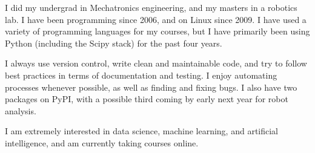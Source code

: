 I did my undergrad in Mechatronics engineering, and my masters in a robotics lab.
I have been programming since 2006, and on Linux since 2009.
I have used a variety of programming languages for my courses, but I have primarily been using Python (including the Scipy stack) for the past four years.

I always use version control, write clean and maintainable code, and try to follow best practices in terms of documentation and testing.
I enjoy automating processes whenever possible, as well as finding and fixing bugs.
I also have two packages on PyPI, with a possible third coming by early next year for robot analysis.

I am extremely interested in data science, machine learning, and artificial intelligence, and am currently taking courses online.
